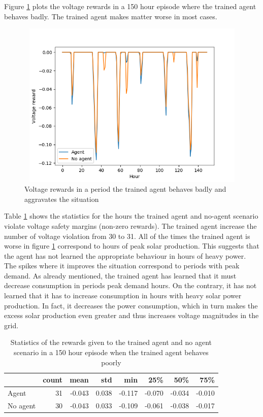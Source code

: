 \documentclass[class=book, crop=false]{standalone}
\begin{document}
Figure \ref{fig:results:config1_150hour_bad_voltage} plots the voltage rewards in a 150 hour episode where the trained agent behaves badly. The trained agent makes matter worse in most cases.

\begin{figure}[H]
    \center
\includegraphics[height=8cm, width=12cm]{figures/config1_150hour_bad_voltage.png}
    \caption[size = 9]{Voltage rewards in a period the trained agent behaves badly and aggravates the situation}
    \label{fig:results:config1_150hour_bad_voltage}
\end{figure}
Table \ref{table:results:config1_150hour_bad_voltage} shows the statistics for the hours the trained agent and no-agent scenario violate voltage safety margins (non-zero rewards). The trained agent increase the number of voltage violation from 30 to 31. All of the times the trained agent is worse in figure \ref{fig:results:config1_150hour_bad_voltage} correspond to hours of peak solar production. This suggests that the agent has not learned the appropriate behaviour in hours of heavy power. The spikes where it improves the situation correspond to periods with peak demand. As already mentioned, the trained agent has learned that it must decrease consumption in periods peak demand hours. On the contrary, it has not learned that it has to increase consumption in hours with heavy solar power production. In fact, it decreases the power consumption, which in turn makes the excess solar production even greater and thus increases voltage magnitudes in the grid.  

\begin{table}[ht]
\center
\begin{tabular}{l|rrrrrrr}
         & count  & mean   & std   & min    & 25\%   & 50\%   & 75\%   \\
\hline
Agent    & 31    & -0.043 & 0.038 & -0.117 & -0.070 & -0.034 & -0.010 \\
No agent & 30    & -0.043 & 0.033 & -0.109 & -0.061 & -0.038 & -0.017 \\
\hline
\end{tabular}
\caption{Statistics of the rewards given to the trained agent and no agent scenario in a 150 hour episode when the trained agent behaves poorly}
\label{table:results:config1_150hour_bad_voltage}
\end{table}
\end{document}
